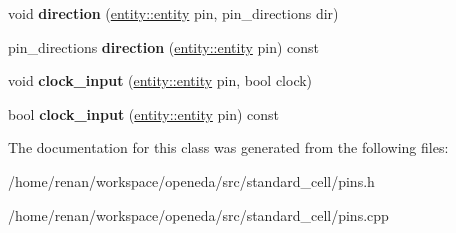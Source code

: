 \begin{DoxyCompactItemize}
\item 
\hypertarget{classophidian_1_1standard__cell_1_1pins_a928748a4cb03162aa638d276caa4fd43}{void {\bfseries direction} (\hyperlink{classophidian_1_1entity_1_1entity}{entity\-::entity} pin, pin\-\_\-directions dir)}\label{classophidian_1_1standard__cell_1_1pins_a928748a4cb03162aa638d276caa4fd43}

\item 
\hypertarget{classophidian_1_1standard__cell_1_1pins_ac91552d25e116f6a9d6346361b0eb94c}{pin\-\_\-directions {\bfseries direction} (\hyperlink{classophidian_1_1entity_1_1entity}{entity\-::entity} pin) const }\label{classophidian_1_1standard__cell_1_1pins_ac91552d25e116f6a9d6346361b0eb94c}

\item 
\hypertarget{classophidian_1_1standard__cell_1_1pins_afffd9e8574ad1acc758960391a4f4f33}{void {\bfseries clock\-\_\-input} (\hyperlink{classophidian_1_1entity_1_1entity}{entity\-::entity} pin, bool clock)}\label{classophidian_1_1standard__cell_1_1pins_afffd9e8574ad1acc758960391a4f4f33}

\item 
\hypertarget{classophidian_1_1standard__cell_1_1pins_a85c246ee2d1ec6f6dfe6eb5ae0142487}{bool {\bfseries clock\-\_\-input} (\hyperlink{classophidian_1_1entity_1_1entity}{entity\-::entity} pin) const }\label{classophidian_1_1standard__cell_1_1pins_a85c246ee2d1ec6f6dfe6eb5ae0142487}

\end{DoxyCompactItemize}


The documentation for this class was generated from the following files\-:\begin{DoxyCompactItemize}
\item 
/home/renan/workspace/openeda/src/standard\-\_\-cell/pins.\-h\item 
/home/renan/workspace/openeda/src/standard\-\_\-cell/pins.\-cpp\end{DoxyCompactItemize}
